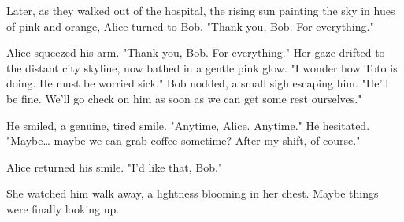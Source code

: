 \documentclass{article}
\begin{document}
Later, as they walked out of the hospital, the rising sun painting the sky in hues of pink and orange, Alice turned to Bob. "Thank you, Bob. For everything."

Alice squeezed his arm. "Thank you, Bob. For everything." Her gaze drifted to the distant city skyline, now bathed in a gentle pink glow. "I wonder how Toto is doing. He must be worried sick." Bob nodded, a small sigh escaping him. "He'll be fine. We'll go check on him as soon as we can get some rest ourselves."

He smiled, a genuine, tired smile. "Anytime, Alice. Anytime." He hesitated. "Maybe… maybe we can grab coffee sometime? After my shift, of course."

Alice returned his smile. "I'd like that, Bob."

She watched him walk away, a lightness blooming in her chest. Maybe things were finally looking up.
\end{document}
